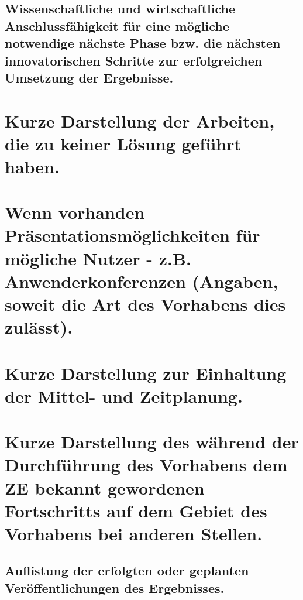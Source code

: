 \subsection{Wissenschaftliche und wirtschaftliche Anschlussfähigkeit für eine mögliche notwendige nächste Phase bzw. die nächsten innovatorischen Schritte zur erfolgreichen Umsetzung der Ergebnisse.}

\section{Kurze Darstellung der Arbeiten, die zu keiner Lösung geführt haben.}

\section{Wenn vorhanden Präsentationsmöglichkeiten für mögliche Nutzer - z.B. Anwenderkonferenzen (Angaben, soweit die Art des Vorhabens dies zulässt).}

\section{Kurze Darstellung zur Einhaltung der Mittel- und Zeitplanung.}

\section{Kurze Darstellung des während der Durchführung des Vorhabens dem ZE bekannt gewordenen Fortschritts auf dem Gebiet des Vorhabens bei anderen Stellen.}

\subsection{Auflistung der erfolgten oder geplanten Veröffentlichungen des Ergebnisses.}

